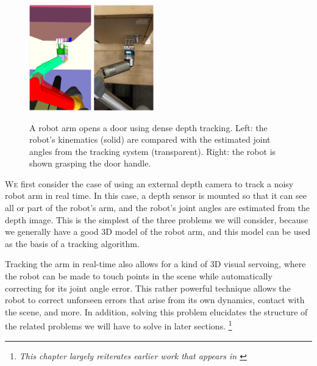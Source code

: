 \label{chap:dense_external_tracking}
\begin{figure}
	\begin{center}
		\includegraphics[width=0.24\textwidth]{img/dense_tracking/door_sim}
		\includegraphics[width=0.23\textwidth]{img/dense_tracking/door_real}
	\end{center}
	\caption{A robot arm opens a door using dense depth tracking. Left: the robot's kinematics (solid) are compared with the estimated joint angles from the tracking system (transparent). Right: the robot is shown grasping the door handle.}
	\label{fig:door_open}
\end{figure}
\lettrine{W}e first consider the case of using an external depth camera to track a noisy robot arm in real time. In this case, a depth sensor is mounted so that it can see all or part of the robot's arm, and the robot's joint angles are estimated from the depth image. This is the simplest of the three problems we will consider, because we generally have a good 3D model of the robot arm, and this model can be used as the basis of a tracking algorithm. 

Tracking the arm in real-time also allows for a kind of 3D visual servoing, where the robot can be made to touch points in the scene while automatically correcting for its joint angle error. This rather powerful technique allows the robot to correct unforseen errors that arise from its own dynamics, contact with the scene, and more. In addition, solving this problem elucidates the structure of the related problems we will have to solve in later sections. \footnote{\textit{This chapter largely reiterates earlier work that appears in \cite{Klingensmith2013}}} 

